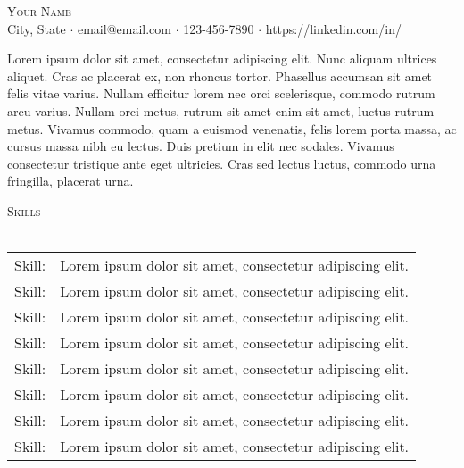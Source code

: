 \documentclass[a4paper]{article}
\newcommand{\lineunder} {
    \vspace*{-8pt} \\
    \hspace*{-18pt} \hrulefill \\
}
\newcommand{\header} [1] {
    {\hspace*{-18pt}\vspace*{6pt} \textsc{#1}}
    \vspace*{-6pt} \lineunder
}
\begin{document}
\vspace*{-40pt}  

\vspace*{-10pt}
\begin{center}
	{\Huge \scshape {Your Name}}\\
    \vspace{2mm}
	City, State $\cdot$ email@email.com $\cdot$ 123-456-7890 $\cdot$ https://linkedin.com/in/\\
\end{center}

Lorem ipsum dolor sit amet, consectetur adipiscing elit.
Nunc aliquam ultrices aliquet. Cras ac placerat ex, non rhoncus tortor. 
Phasellus accumsan sit amet felis vitae varius. Nullam efficitur lorem nec
orci scelerisque, commodo rutrum arcu varius. Nullam orci metus, 
rutrum sit amet enim sit amet, luctus rutrum metus. Vivamus commodo, 
quam a euismod venenatis, felis lorem porta massa, ac cursus massa nibh 
eu lectus. Duis pretium in elit nec sodales. Vivamus consectetur tristique 
ante eget ultricies. Cras sed lectus luctus, commodo urna fringilla, placerat urna.

\vspace{2mm}

\header{Skills}
\vspace{1mm}
\begin{tabular}{ l l }
	Skill:           & Lorem ipsum dolor sit amet, consectetur adipiscing elit. \\
    Skill:           & Lorem ipsum dolor sit amet, consectetur adipiscing elit. \\
    Skill:           & Lorem ipsum dolor sit amet, consectetur adipiscing elit. \\
    Skill:           & Lorem ipsum dolor sit amet, consectetur adipiscing elit. \\
    Skill:           & Lorem ipsum dolor sit amet, consectetur adipiscing elit. \\
    Skill:           & Lorem ipsum dolor sit amet, consectetur adipiscing elit. \\
    Skill:           & Lorem ipsum dolor sit amet, consectetur adipiscing elit. \\
    Skill:           & Lorem ipsum dolor sit amet, consectetur adipiscing elit. \\
\end{tabular}
\vspace{2mm}
\end{document}

